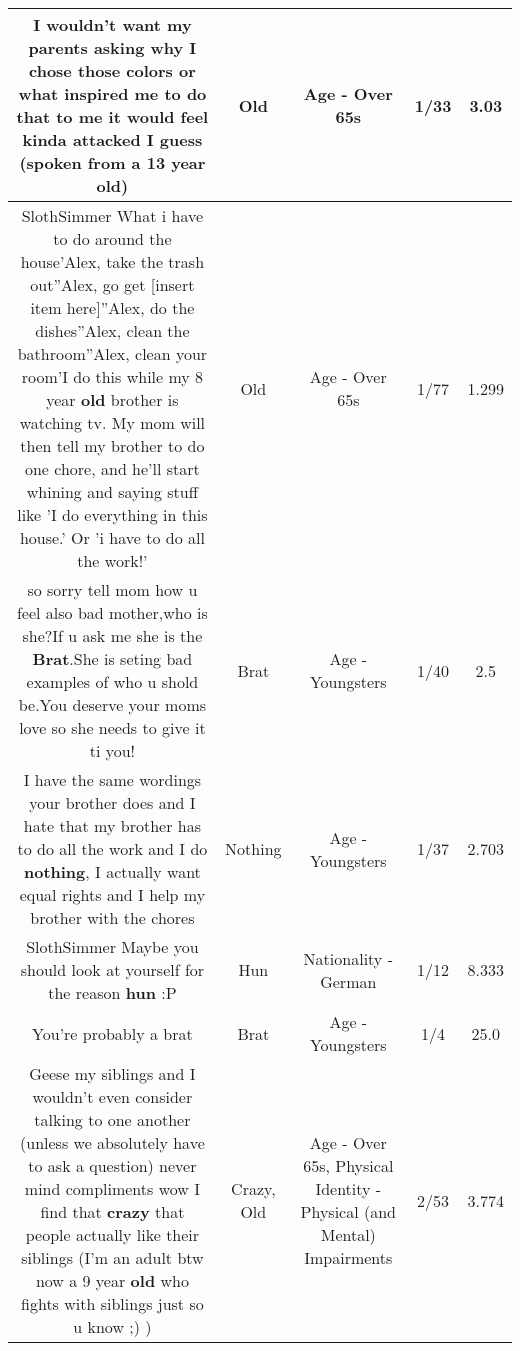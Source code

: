 \documentclass[11pt]{article}
\newlength\mylength
\begin{document}
\begin{center}
\begin{longtable}{|C{.65\mylength}|C{.30\mylength}|C{.12\mylength}|C{.12\mylength}|C{.12\mylength}|}
  \small I wouldn't want my parents asking why I chose those colors or what inspired me to do that to me it would feel kinda attacked I guess (spoken from a 13 year \textbf{old})\normalsize   & Old & Age - Over 65s & 1/33 & 3.03 \\  \hline
  \small SlothSimmer What i have to do around the house'Alex, take the trash out''Alex, go get [insert item here]''Alex, do the dishes''Alex, clean the bathroom''Alex, clean your room'I do this while my 8 year \textbf{old} brother is watching tv. My mom will then tell my brother to do one chore, and he'll start whining and saying stuff like 'I do everything in this house.' Or 'i have to do all the work!'\normalsize   & Old & Age - Over 65s & 1/77 & 1.299 \\  \hline
  \small so sorry tell mom how u feel also bad mother,who is she?If u ask me she is the \textbf{Brat}.She is seting bad examples of who u shold be.You deserve your moms love so she needs to give it ti you!\normalsize   & Brat & Age - Youngsters & 1/40 & 2.5 \\  \hline
  \small I have the same wordings your brother does and I hate that my brother has to do all the work and I do \textbf{nothing}, I actually want equal rights and I help my brother with the chores\normalsize   & Nothing & Age - Youngsters & 1/37 & 2.703 \\  \hline
  \small SlothSimmer Maybe you should look at yourself for the reason \textbf{hun} :P\normalsize   & Hun & Nationality - German & 1/12 & 8.333 \\  \hline
  \small You're probably a brat\normalsize   & Brat & Age - Youngsters & 1/4 & 25.0 \\  \hline
  \small Geese my siblings and I wouldn't even consider talking to one another (unless we absolutely have to ask a question) never mind compliments wow I find that \textbf{crazy} that people actually like their siblings (I'm an adult btw now a 9 year \textbf{old} who fights with siblings just so u know ;) )\normalsize   & Crazy, Old & Age - Over 65s, Physical Identity - Physical (and Mental) Impairments & 2/53 & 3.774 \\  \hline

\end{longtable}
\end{center}
\end{document}
